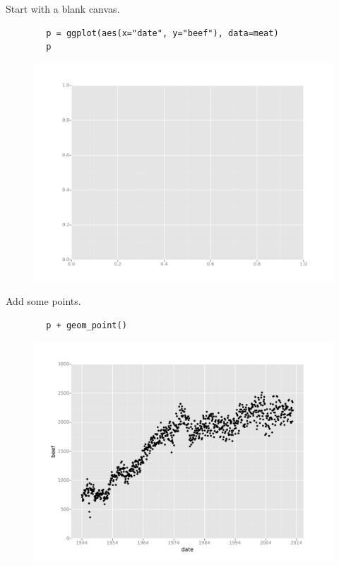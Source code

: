 \documentclass{beamer}
\begin{document}
\begin{frame}[fragile]
	Start with a blank canvas.
	\begin{framed}
		\begin{verbatim}
		p = ggplot(aes(x="date", y="beef"), data=meat)
		p
		\end{verbatim}
	\end{framed}
	\begin{figure}
		\centering
		\includegraphics[width=0.7\linewidth]{Layers1}
		\caption{}
		\label{fig:Layers1}
	\end{figure}
	
\end{frame}
\begin{frame}[fragile]
	Add some points.
	\begin{framed}
		\begin{verbatim}
		p + geom_point()
		\end{verbatim}
	\end{framed}
	\begin{figure}
		\centering
		\includegraphics[width=0.7\linewidth]{Layers2}
	\end{figure}
	
	
\end{frame}
\end{document}

